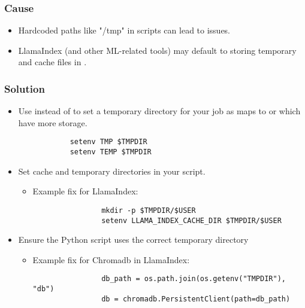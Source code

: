 \subsubsection{Cause}
\begin{itemize}
	\item Hardcoded paths like "/tmp" in scripts can lead to issues.
	\item LlamaIndex (and other ML-related tools) may default to storing temporary and cache files in .
\end{itemize}

\subsubsection{Solution}
\begin{itemize}

	\item Use  instead of  to set a temporary directory for your job 
		as  maps to  or  which have more storage.
		\begin{verbatim}
			setenv TMP $TMPDIR
			setenv TEMP $TMPDIR
		\end{verbatim}

	\item Set cache and temporary directories in your script.
		\begin{itemize}
			\item Example fix for LlamaIndex:
			\begin{verbatim}
				mkdir -p $TMPDIR/$USER
				setenv LLAMA_INDEX_CACHE_DIR $TMPDIR/$USER
			\end{verbatim}
		\end{itemize}

	\item Ensure the Python script uses the correct temporary directory
		\begin{itemize}
			\item Example fix for Chromadb in LlamaIndex:
			\begin{verbatim}
				db_path = os.path.join(os.getenv("TMPDIR"), "db")
				db = chromadb.PersistentClient(path=db_path)
			\end{verbatim}
		\end{itemize}

\end{itemize}